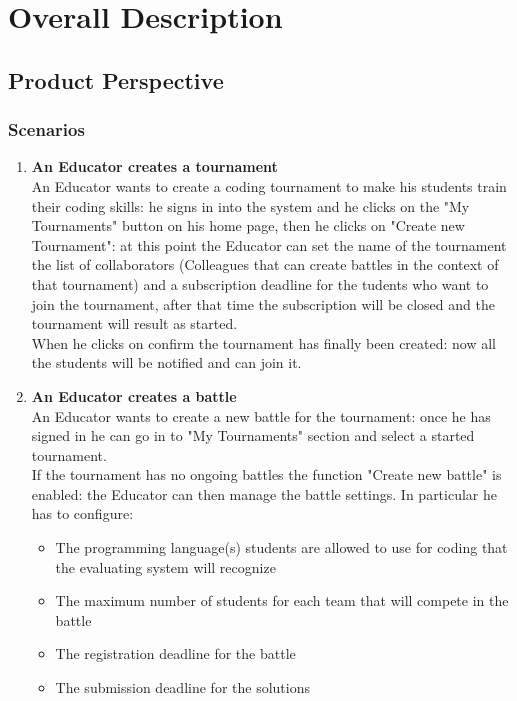 \documentclass{article}
\begin{document}
\newpage

\section{Overall Description}
\subsection{Product Perspective}
\subsubsection{Scenarios}
\begin{enumerate}
  \item \textbf{An Educator creates a tournament\\}An Educator wants to create a coding tournament to make his students train their
  coding skills: he signs in into the system and he clicks on the "My Tournaments" button on his home page, then he clicks on "Create new Tournament":
  at this point the Educator can set the name of the tournament the list of collaborators (Colleagues that can create battles in the context of that tournament) and a subscription
  deadline for the tudents who want to join the tournament, after that time the subscription will be closed and the tournament will result as started.\\
  When he clicks on confirm the tournament has finally been created: now all the students will be notified and can join it.\\
  \item \textbf{An Educator creates a battle\\}An Educator wants to create a new battle for the tournament: once he has signed in he can go in to "My Tournaments" section
  and select a started tournament.\\
  If the tournament has no ongoing battles the function "Create new battle" is enabled: the Educator can then manage the battle settings.
  In particular he has to configure:
  \begin{itemize}
    \item The programming language(s) students are allowed to use for coding that the evaluating system will recognize
    \item The maximum number of students for each team that will compete in the battle
    \item The registration deadline for the battle
    \item The submission deadline for the solutions

\end{itemize}
\end{enumerate}
\end{document}
